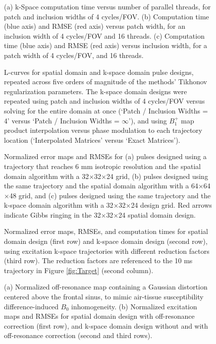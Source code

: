 \documentclass[11pt]{article}
\begin{document}
\begin{figure}[!h]
	\centering
	\caption{(a) k-Space computation time versus number of parallel threads, for patch and inclusion widths of 4 cycles/FOV. 
	(b) Computation time (blue axis) and RMSE (red axis) versus patch width, for an inclusion width of 4 cycles/FOV and 16 threads. 
	(c) Computation time (blue axis) and RMSE (red axis) versus inclusion width, for a patch width of 4 cycles/FOV, and 16 threads.}
	\label{fig:ComputationTime}
\end{figure}

\begin{figure}[!h]
	\centering
	\caption{L-curves for spatial domain and k-space domain pulse designs, 
	repeated across five orders of magnitude of the methods' Tikhonov regularization parameters.
	The k-space domain designs were repeated using patch and inclusion widths of 4 cycles/FOV versus solving for the entire domain at once (`Patch / Inclusion Widths = 4' versus `Patch / Inclusion Widths = $\infty$'),
	and using $B_1^+$ map product interpolation versus phase modulation to each trajectory location (`Interpolated Matrices' versus
	`Exact Matrices').}
	\label{fig:LCurves}
\end{figure}


\begin{figure}[!h]
	\centering
	\caption{Normalized error maps and RMSEs for 
	(a) pulses designed using a trajectory that reaches 6 mm isotropic resolution
	and the spatial domain algorithm with a 32$\times$32$\times$24 grid, 
	(b) pulses designed using the same trajectory and the spatial domain algorithm with a 64$\times$64$\times$48 grid,  
	and (c) pulses designed using the same trajectory and the k-space domain algorithm with a 32$\times$32$\times$24 design grid. 
	Red arrows indicate Gibbs ringing in the 32$\times$32$\times$24 spatial domain design.}
	\label{fig:GibbsRing}
\end{figure}


\begin{figure}[!h]
	\centering
	\caption{Normalized error maps, RMSEs, and computation times 
	for spatial domain design (first row) and k-space domain design (second row), 
	using excitation k-space trajectories with different reduction factors (third row).
	The reduction factors are referenced to the 10 ms trajectory in Figure \ref{fig:Target} (second column).}
	\label{fig:kspace_PTX_Acceleration}
\end{figure}


\begin{figure}[!h]
	\centering
	\caption{
	(a) Normalized off-resonance map containing a Gaussian distortion centered above the frontal sinus, 
	to mimic air-tissue susceptibility difference-induced $B_0$ inhomogeneity.
	(b) Normalized excitation maps and RMSEs for spatial domain design with off-resonance correction (first row), 
	and k-space domain design without and with off-resonance correction (second and third rows).}
	\label{fig:kspace_PTX_B0}
\end{figure}
\end{document}
